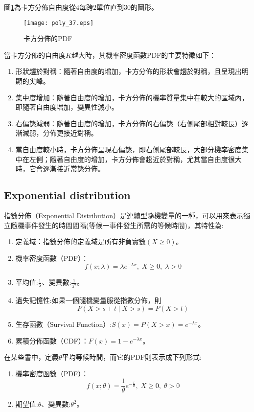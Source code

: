 \documentclass[12pt, a4paper]{article}
\begin{document}
圖\;\ref{fig:poly_37.eps}\;為卡方分佈自由度從\;$4$\;每跨\;$2$\;單位直到\;$30$\;的圖形。
\begin{figure}[H]
\centering
\texttt{[image: poly\_37.eps]}
\caption{卡方分佈的PDF}
\label{fig:poly_37.eps}
\end{figure}

當卡方分佈的自由度\;$K$\;越大時，其機率密度函數PDF的主要特徵如下：
\begin{enumerate}
\item 形狀趨於對稱：隨著自由度的增加，卡方分佈的形狀會趨於對稱，且呈現出明顯的尖峰。
\item 集中度增加：隨著自由度的增加，卡方分佈的機率質量集中在較大的區域內，即隨著自由度增加，變異性減小。
\item 右偏態減弱：隨著自由度的增加，卡方分佈的右偏態（右側尾部相對較長）逐漸減弱，分佈更接近對稱。
\item 當自由度較小時，卡方分佈呈現右偏態，即右側尾部較長，大部分機率密度集中在左側；隨著自由度的增加，卡方分佈會趨近於對稱，尤其當自由度很大時，它會逐漸接近常態分佈。
\end{enumerate}


\subsection{Exponential distribution}
指數分佈（Exponential Distribution）是連續型隨機變量的一種，可以用來表示獨立隨機事件發生的時間間隔(等候一事件發生所需的等候時間)，其特性為\;:

\begin{enumerate}
\item 定義域：指數分佈的定義域是所有非負實數\;$(X \geq 0)$\;。
\item 機率密度函數（PDF）：
$$f(x;\lambda) = \lambda {e^{-\lambda x}},\; X \geq 0,\;\lambda>0$$
\item 平均值\;:\;$\frac{1}{\lambda}$\;、變異數\;:\;$\frac{1}{\lambda ^2}$\;。
\item 遺失記憶性\;:\;如果一個隨機變量服從指數分佈，則$$ P(X > s+t \mid X > s) = P(X > t)$$
\item 生存函數（Survival Function）\;:\;$ S(x) = P(X > x) = e^{-\lambda x}$\;。
\item 累積分佈函數（CDF）\;：\;$F(x) = 1 - e^{-\lambda x}$\;。
\end{enumerate}

在某些書中，定義\;$\theta$\;平均等候時間，而它的PDF則表示成下列形式\;:
\begin{enumerate}
\item 機率密度函數（PDF）：
$$f(x;\theta) = \frac{1}{\theta} e^{-\frac{x}{\theta}},\;X \geq 0,\; \theta>0$$
\item 期望值\;:\;$\theta$\;、變異數\;:\;$\theta^2$\;。
\end{enumerate}
\end{document}
